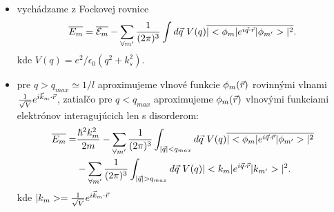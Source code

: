 \documentclass[
	11pt, %
]{beamer}
\begin{document}
\begin{frame}
\begin{itemize}
\item vychádzame z Fockovej rovnice
\begin{equation}
\label{eq:erg_meandis nex}
 \overline{E_m}=\overline{\mathcal{E}_m}-\sum_{\forall m'} \frac{1}{(2\pi)^{3}} \int d\vec{q}\ V(q) \overline{|<\phi_m|e^{i\vec{q}\cdot\vec{r}}|\phi_{m'}>|^2} \text{.}
\end{equation}
kde $V(q) = e^2/\epsilon_0(q^2+k_s^2)$.
\item pre $q > q_{max} \simeq 1/l$ aproximujeme vlnové funkcie $\phi_m(\vec{r})$ rovinnými vlnami $\frac{1}{\sqrt V}e^{i\vec{k}_m\cdot\vec{r}}$, zatiaľčo pre $q < q_{max}$ aproximujeme
$\phi_m(\vec{r})$ vlnovými funkciami elektrónov interagujúcich len s disorderom:
\begin{equation}\label{eq:erg_meandis nex nex}
\begin{split}
 \overline{E_m}= &\frac{\hbar^2 k_m^2}{2m} - \sum_{\forall m'} \frac{1}{(2\pi)^{3}} \int_{|\vec{q}| < q_{max}} d\vec{q}\ V(q) \overline{|<\phi_m|e^{i\vec{q}\cdot\vec{r}}|\phi_{m'}>|^2}  \\
    &  - \sum_{\forall m'} \frac{1}{(2\pi)^{3}} \int_{|\vec{q}| > q_{max}} d\vec{q}\ V(q) |<k_m|e^{i\vec{q}\cdot\vec{r}}|k_{m'}>|^2 \text{.}
\end{split}
\end{equation}
kde $|k_{m}>= \frac{1}{\sqrt V}e^{i\vec{k}_m\cdot\vec{r}}$
\end{itemize}
\end{frame}
\end{document}
